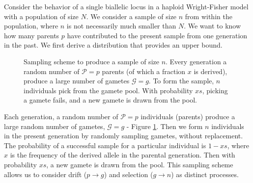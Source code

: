 \documentclass[review]{elsarticle}
\newcommand{\drawcirclerow}[5][0] { %
  \FPadd\stop#2#1
  \foreach \i in {#1,...,\stop} {
    \ifnum \i < \stop
    \fill[#3] (\i, #4) circle (#5);
    \draw (\i, #4) circle (#5); 
    \fi
  }
}
\begin{document}
Consider the behavior of a single biallelic locus in a haploid Wright-Fisher model with a population
of size $N$. We consider a sample of size $n$ from within the population, where $n$ is not
necessarily much smaller than $N$. We want to know how many parents $p$ have contributed to the
present sample from one generation in the past. We first derive a distribution that provides an
upper bound.

\begin{figure}
  \centering
    \caption{Sampling scheme to produce a sample of size $n$. Every generation a random number of
      $\mathcal{P}=p$ parents (of which a fraction $x$ is derived), produce a large number of
      gametes $\mathcal{G}=g$. To form the sample, $n$ individuals pick from the gamete pool. With
      probability $xs$, picking a gamete fails, and a new gamete is drawn from the pool.}
    \label{fig:sampling}
\end{figure}

Each generation, a random number of $\mathcal{P}=p$ individuals (parents) produce a large random
number of gametes, $\mathcal{G}=g$ - Figure \ref{fig:sampling}. Then we form $n$ individuals in the present
generation by randomly sampling gametes, without replacement. The probability of a successful sample
for a particular individual is $1-xs$, where $x$ is the frequency of the derived allele in the
parental generation. Then with probability $xs$, a new gamete is drawn from the pool. This sampling
scheme allows us to consider drift ($p \rightarrow g$) and selection ($g \rightarrow n$) as distinct
processes.
\end{document}
